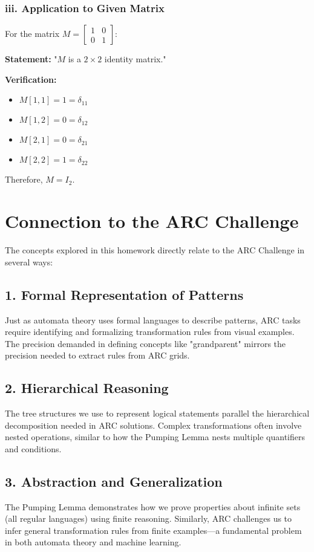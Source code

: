 \documentclass[12pt]{article}
\theoremstyle{definition}
\begin{document}
\subsubsection*{iii. Application to Given Matrix}
For the matrix $M = \begin{bmatrix} 1 & 0 \\ 0 & 1 \end{bmatrix}$:

\textbf{Statement:} "$M$ is a $2 \times 2$ identity matrix."

\textbf{Verification:}
\begin{itemize}
    \item $M[1,1] = 1 = \delta_{11}$ \checkmark
    \item $M[1,2] = 0 = \delta_{12}$ \checkmark
    \item $M[2,1] = 0 = \delta_{21}$ \checkmark
    \item $M[2,2] = 1 = \delta_{22}$ \checkmark
\end{itemize}
Therefore, $M = I_2$.

\section*{Connection to the ARC Challenge}

The concepts explored in this homework directly relate to the ARC Challenge in several ways:

\subsection*{1. Formal Representation of Patterns}
Just as automata theory uses formal languages to describe patterns, ARC tasks require identifying and formalizing transformation rules from visual examples. The precision demanded in defining concepts like "grandparent" mirrors the precision needed to extract rules from ARC grids.

\subsection*{2. Hierarchical Reasoning}
The tree structures we use to represent logical statements parallel the hierarchical decomposition needed in ARC solutions. Complex transformations often involve nested operations, similar to how the Pumping Lemma nests multiple quantifiers and conditions.

\subsection*{3. Abstraction and Generalization}
The Pumping Lemma demonstrates how we prove properties about infinite sets (all regular languages) using finite reasoning. Similarly, ARC challenges us to infer general transformation rules from finite examples—a fundamental problem in both automata theory and machine learning.
\end{document}
